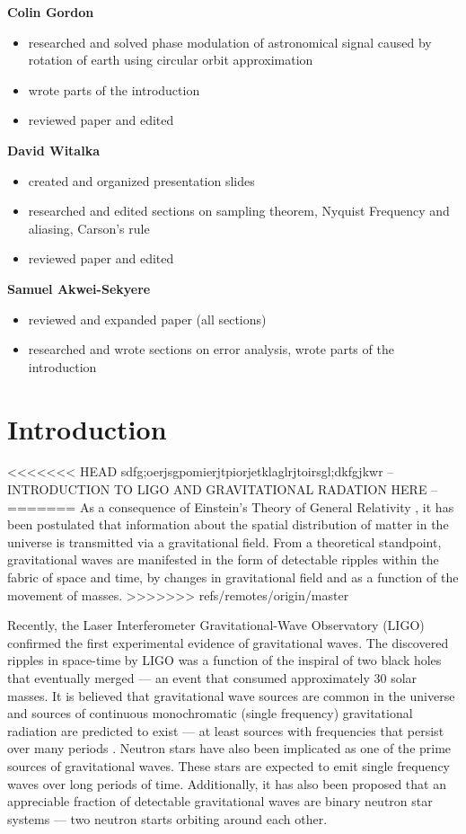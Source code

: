 \documentclass[onecolumn, groupedaddress, 10pt]{revtex4-1}
\begin{document}
\textbf{Colin Gordon}
\begin{itemize}
\item researched and solved phase modulation of astronomical signal caused by rotation of earth using circular orbit approximation
\item wrote parts of the introduction
\item reviewed paper and edited
\end{itemize}

\textbf{David Witalka}
\begin{itemize}
\item created and organized presentation slides
\item researched and edited sections on sampling theorem, Nyquist Frequency and aliasing, Carson’s rule
\item reviewed paper and edited
\end{itemize}

\textbf{Samuel Akwei-Sekyere}
\begin{itemize}
\item reviewed and expanded paper (all sections)
\item researched and wrote sections on error analysis, wrote parts of the introduction
\end{itemize}

\pagebreak


\section{Introduction}
<<<<<<< HEAD
sdfg;oerjsgpomierjtpiorjetklaglrjtoirsgl;dkfgjkwr
-- INTRODUCTION TO LIGO AND GRAVITATIONAL RADATION HERE --
=======
As a consequence of Einstein's Theory of General Relativity \cite{}, it has been postulated that information about the spatial distribution of matter in the universe is transmitted via a gravitational field. From a theoretical standpoint, gravitational waves are manifested in the form of detectable ripples within the fabric of space and time, by changes in gravitational field and as a function of the movement of masses.
>>>>>>> refs/remotes/origin/master


Recently, the Laser Interferometer Gravitational-Wave Observatory (LIGO) confirmed the first experimental evidence of gravitational waves. The discovered ripples in space-time by LIGO was a function of the inspiral of two black holes that eventually merged --- an event that consumed approximately 30 solar masses. It is believed that gravitational wave sources are common in the universe and sources of continuous monochromatic (single frequency) gravitational radiation are predicted to exist --- at least sources with frequencies that persist over many periods \cite{}. Neutron stars have also been implicated as one of the prime sources of gravitational waves. These stars are expected to emit single frequency waves over long periods of time. Additionally, it has also been proposed that an appreciable fraction of detectable gravitational waves are binary neutron star systems --- two neutron starts orbiting around each other.
\end{document}
